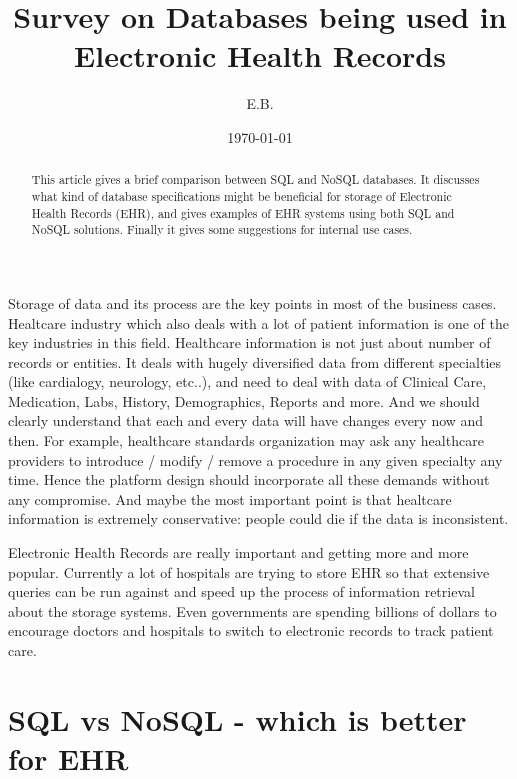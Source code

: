 \documentclass{article}
\begin{document}
\title{Survey on Databases being used in Electronic Health Records}   %
\author{E.B.}         %
\date{\today}    %
\maketitle

\begin{abstract}
This article gives a brief comparison between SQL and NoSQL databases. It discusses what kind of database specifications might be beneficial for storage of Electronic Health Records (EHR), and gives examples of EHR systems using both SQL and NoSQL solutions. Finally it gives some suggestions for internal use cases. \\
\end{abstract} 

Storage of data and its process are the key points in most of the business cases.  Healtcare industry which also deals with a lot of patient information is one of the key industries in this field. Healthcare information is not just about number of records or entities. It deals with hugely diversified data from different specialties (like cardialogy, neurology, etc..), and need to deal with data of Clinical Care, Medication, Labs, History, Demographics, Reports and more. And we should clearly understand that each and every data will have changes every now and then. For example, healthcare standards organization may ask any healthcare providers to introduce / modify / remove a procedure in any given specialty any time. Hence the platform design should incorporate all these demands without any compromise\cite{online3}. And maybe the most important point is that healtcare information is extremely conservative: people could die if the data is inconsistent\cite{online4}.
 
Electronic Health Records are really important and getting more and more popular. Currently a lot of hospitals are trying to store EHR so that extensive queries can be run against and speed up the process of information retrieval about the storage systems. Even governments are spending billions of dollars to encourage doctors and hospitals to switch to electronic records to track patient care\cite{online5}.

\section{SQL vs NoSQL - which is better for EHR}
\end{document}
